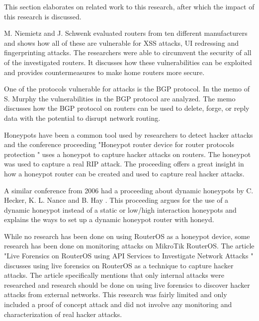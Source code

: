 This section elaborates on related work to this research, after which the impact of this research is discussed.

M. Niemietz and J. Schwenk \cite{ROUTERSEC:RUB:2015} evaluated routers from ten different manufacturers and shows how all of these are vulnerable for XSS attacks, UI redressing and fingerprinting attacks. The researchers were able to circumvent the security of all of the investigated routers. It discusses how these vulnerabilities can be exploited and provides countermeasures to make home routers more secure.
 
One of the protocols vulnerable for attacks is the BGP protocol. In the memo of S. Murphy \cite{BGPHIJACKING:INTSOC:2006} the vulnerabilities in the BGP protocol are analyzed. The memo discusses how the BGP protocol on routers can be used to delete, forge, or reply data with the potential to disrupt network routing.

Honeypots have been a common tool used by researchers to detect hacker attacks and the conference proceeding "Honeypot router device for router protocols protection \cite{HONEYPOT:IEETR:2009}" uses a honeypot to capture hacker attacks on routers. The honeypot was used to capture a real RIP attack. The proceeding offers a great insight in how a honeypot router can be created and used to capture real hacker attacks. 

A similar conference from 2006 had a  proceeding about dynamic honeypots by C. Hecker, K. L. Nance and B. Hay \cite{HONEYPOT:MARY:2006}. This proceeding argues for the use of a dynamic honeypot instead of a static or low/high interaction honeypots and explains the ways to set up a dynamic honeypot router with honeyd.

While no research has been done on using RouterOS as a honeypot device, some research has been done on monitoring attacks on MikroTik RouterOS. The article "Live Forensics on RouterOS using API Services to Investigate Network Attacks \cite{ROUTEROSFORENSICS:IJCSIS:2017}" discusses using live forensics on RouterOS as a technique to capture hacker attacks. The article specifically mentions that only internal attacks were researched and research should be done on using live forensics to discover hacker attacks from external networks. This research was fairly limited and only included a proof of concept attack and did not involve any monitoring and characterization of real hacker attacks.

